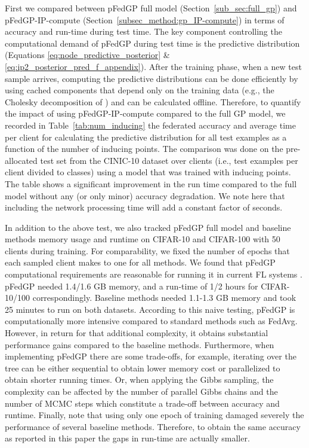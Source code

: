 \documentclass{article}
\def\Secref#1{Section~\ref{#1}}
\newcommand{\tblref}[1]{Table~\ref{#1}}
\begin{document}
First we compared between pFedGP full model (\Secref{sub_sec:full_gp}) and pFedGP-IP-compute  (\Secref{subsec_method:gp_IP-compute}) in terms of accuracy and run-time during test time. The key component controlling the computational demand of pFedGP during test time is the predictive distribution (Equations \ref{eq:node_predictive_posterior} \& \ref{eq:ip2_posterior_pred_f_appendix}). After the training phase, when a new test sample arrives, computing the predictive distributions can be done efficiently by using cached components that depend only on the training data (e.g., the Cholesky decomposition of ) and can be calculated offline. Therefore, to quantify the impact of using pFedGP-IP-compute compared to the full GP model, we recorded in \tblref{tab:num_inducing} the federated accuracy and average time per client for calculating the predictive distribution for all test examples as a function of the number of inducing points. The comparison was done on the pre-allocated test set from the CINIC-10 dataset over  clients (i.e.,  test examples per client divided to  classes) using a model that was trained with  inducing points. The table shows a significant improvement in the run time compared to the full model without any (or only minor) accuracy degradation. We note here that including the network processing time will add a constant factor of  seconds.

In addition to the above test, we also tracked pFedGP full model and baseline methods memory usage and runtime on CIFAR-10 and CIFAR-100 with 50 clients during training. For comparability, we fixed the number of epochs that each sampled client makes to one for all methods. We found that pFedGP computational requirements are reasonable for running it in current FL systems \cite{cai2021towards}. 
pFedGP needed  1.4/1.6 GB memory, and a run-time of  1/2 hours for CIFAR-10/100 correspondingly. Baseline methods needed 1.1-1.3 GB memory and took  25 minutes to run on both datasets. According to this naive testing, pFedGP is computationally more intensive compared to standard methods such as FedAvg. However, in return for that additional complexity, it obtains substantial performance gains compared to the baseline methods. Furthermore, when implementing pFedGP there are some trade-offs, for example, iterating over the tree can be either sequential to obtain lower memory cost or parallelized to obtain shorter running times. Or, when applying the Gibbs sampling, the complexity can be affected by the number of parallel Gibbs chains and the number of MCMC steps which constitute a trade-off between accuracy and runtime. Finally, note that using only one epoch of training damaged severely the performance of several baseline methods. Therefore, to obtain the same accuracy as reported in this paper the gaps in run-time are actually smaller.
\end{document}
